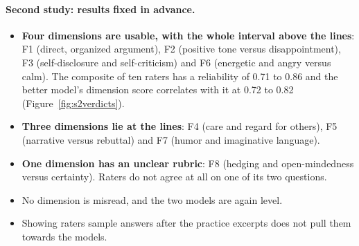 \paragraph{Second study: results fixed in advance.}
\begin{itemize}
\item \textbf{Four dimensions are usable, with the whole interval above the lines}: F1 (direct, organized
  argument), F2 (positive tone versus disappointment), F3 (self-disclosure and self-criticism) and F6 (energetic
  and angry versus calm). The composite of ten raters has a reliability of 0.71 to 0.86 and the better model's
  dimension score correlates with it at 0.72 to 0.82 (Figure~\ref{fig:s2verdicts}).
\item \textbf{Three dimensions lie at the lines}: F4 (care and regard for others), F5 (narrative versus
  rebuttal) and F7 (humor and imaginative language).
\item \textbf{One dimension has an unclear rubric}: F8 (hedging and open-mindedness versus certainty). Raters do
  not agree at all on one of its two questions.
\item No dimension is misread, and the two models are again level.
\item Showing raters sample answers after the practice excerpts does not pull them towards the models.
\end{itemize}

